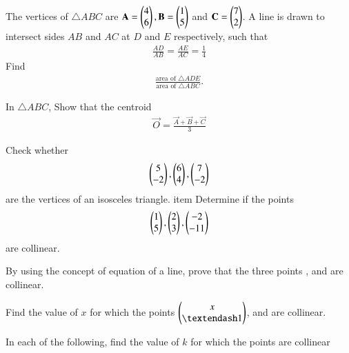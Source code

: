 %
\item The vertices of $\triangle ABC$ are $\mathbf{A}=\begin{pmatrix}4\\6\end{pmatrix},  \mathbf{B}=\begin{pmatrix}1\\5\end{pmatrix}$ and  $\mathbf{C} =  \begin{pmatrix}7\\2\end{pmatrix}$.  A line is drawn to intersect sides $AB$ and $AC$ at $D$ and $E$ respectively, such that
\begin{align}
\frac{AD}{AB}=\frac{AE}{AC}= \frac{1}{4}
\end{align}
%
Find 
\begin{align}
\frac{\text{area of }\triangle ADE}{\text{area of }\triangle ABC}.
\end{align}
\item In $\triangle ABC$, Show that the centroid 
\begin{align}
\vec{O} = \frac{\vec{A}+\vec{B}+\vec{C}}{3}
\end{align}

\item Check whether 
\begin{align}
\begin{pmatrix}5\\-2\end{pmatrix}, \begin{pmatrix}6\\4\end{pmatrix}, \begin{pmatrix}7\\-2\end{pmatrix}
\end{align}
are the vertices of an isosceles triangle.
%
 item Determine if the points 
\begin{align}
\begin{pmatrix}1\\5\end{pmatrix}, \begin{pmatrix}2\\3\end{pmatrix}, \begin{pmatrix}-2\\-11\end{pmatrix}
\end{align}
%
are collinear.	
\item By using the concept of equation of a line, prove that the three points ,  and  are collinear.
\item Find the value of $x$ for which the points $\myvec{x\\ – 1}$,  and  are collinear.
\item  In each of the following, find the value of $k$ for which the points are collinear

